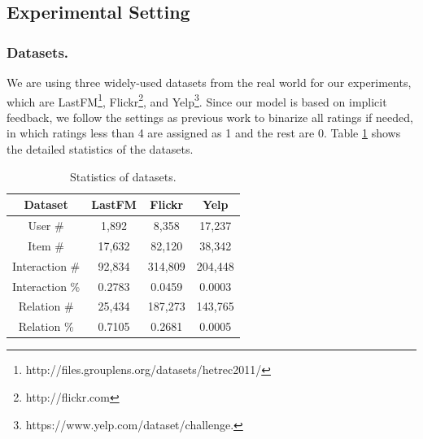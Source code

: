 \documentclass[letterpaper]{article} %
\begin{document}
\subsection{Experimental Setting}
\subsubsection{Datasets.}
We are using three widely-used datasets from the real world for our experiments, which are LastFM\footnote{http://files.grouplens.org/datasets/hetrec2011/}, Flickr\footnote{http://flickr.com}, and Yelp\footnote{https://www.yelp.com/dataset/challenge.}. Since our model is based on implicit feedback, we follow the settings as previous work \cite{MHCN} to binarize all ratings if needed, in which ratings less than 4 are assigned as 1 and the rest are 0. Table \ref{table_data} shows the detailed statistics of the datasets. 
\begin{table}[ht]
    \centering
    \begin{tabular}{c|ccc}
    \hline
    Dataset            & LastFM    & Flickr    & Yelp     \\ \hline\hline
    User \#            &1,892      &8,358      &17,237    \\
    Item \#            &17,632     &82,120     &38,342    \\
    Interaction \#     &92,834     &314,809    &204,448   \\  
    Interaction \%     &0.2783     &0.0459     &0.0003    \\
    Relation \#        &25,434     &187,273    &143,765   \\ 
    Relation \%        &0.7105     &0.2681     &0.0005    \\\hline
    \end{tabular}
    \caption{Statistics of datasets.}
    \label{table_data}
\end{table}
\end{document}
